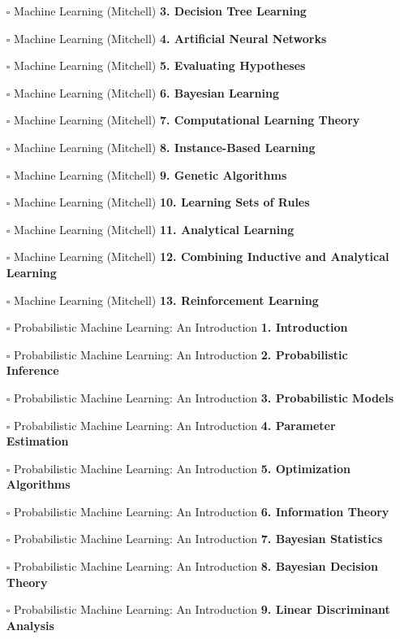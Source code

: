\documentclass[a4, landscape, 12pt]{article}
\newcommand{\checkbox}{$\square$}%
\begin{document}
\begin{itemize}
{}
\item [\checkbox]  Machine Learning (Mitchell) \textbf{ 3. Decision Tree Learning
}
\item [\checkbox]  Machine Learning (Mitchell) \textbf{ 4. Artificial Neural Networks
}
\item [\checkbox]  Machine Learning (Mitchell) \textbf{ 5. Evaluating Hypotheses
}
\item [\checkbox]  Machine Learning (Mitchell) \textbf{ 6. Bayesian Learning
}
\item [\checkbox]  Machine Learning (Mitchell) \textbf{ 7. Computational Learning Theory
}
\item [\checkbox]  Machine Learning (Mitchell) \textbf{ 8. Instance-Based Learning
}
\item [\checkbox]  Machine Learning (Mitchell) \textbf{ 9. Genetic Algorithms
}
\item [\checkbox]  Machine Learning (Mitchell) \textbf{ 10. Learning Sets of Rules
}
\item [\checkbox]  Machine Learning (Mitchell) \textbf{ 11. Analytical Learning
}
\item [\checkbox]  Machine Learning (Mitchell) \textbf{ 12. Combining Inductive and Analytical Learning
}
\item [\checkbox]  Machine Learning (Mitchell) \textbf{ 13. Reinforcement Learning
}
\item [\checkbox]  Probabilistic Machine Learning: An Introduction \textbf{ 1. Introduction
}
\item [\checkbox]  Probabilistic Machine Learning: An Introduction \textbf{ 2. Probabilistic Inference
}
\item [\checkbox]  Probabilistic Machine Learning: An Introduction \textbf{ 3. Probabilistic Models
}
\item [\checkbox]  Probabilistic Machine Learning: An Introduction \textbf{ 4. Parameter Estimation
}
\item [\checkbox]  Probabilistic Machine Learning: An Introduction \textbf{ 5. Optimization Algorithms
}
\item [\checkbox]  Probabilistic Machine Learning: An Introduction \textbf{ 6. Information Theory
}
\item [\checkbox]  Probabilistic Machine Learning: An Introduction \textbf{ 7. Bayesian Statistics
}
\item [\checkbox]  Probabilistic Machine Learning: An Introduction \textbf{ 8. Bayesian Decision Theory
}
\item [\checkbox]  Probabilistic Machine Learning: An Introduction \textbf{ 9. Linear Discriminant Analysis
}
\end{itemize}
\end{document}
